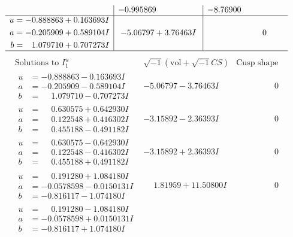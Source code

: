\documentclass[1p]{elsarticle_modified}
\theoremstyle{definition}
\newcommand{\I}{\sqrt{-1}}
\begin{document}
$$\begin{array}{c|c|c}
 & -0.995869\phantom{ +0.000000I} & -8.76900\phantom{ +0.000000I} \\ \hline\begin{aligned}
u &= -0.888863 + 0.163693 I \\
a &= -0.205909 + 0.589104 I \\
b &= \phantom{-}1.079710 + 0.707273 I\end{aligned}
 & -5.06797 + 3.76463 I & \phantom{-0.000000 } 0\\
 \hline 
 \end{array}$$\newpage$$\begin{array}{c|c|c}  
\text{Solutions to }I^u_{1}& \I (\text{vol} + \sqrt{-1}CS) & \text{Cusp shape}\\
 \hline 
\begin{aligned}
u &= -0.888863 - 0.163693 I \\
a &= -0.205909 - 0.589104 I \\
b &= \phantom{-}1.079710 - 0.707273 I\end{aligned}
 & -5.06797 - 3.76463 I & \phantom{-0.000000 } 0 \\ \hline\begin{aligned}
u &= \phantom{-}0.630575 + 0.642930 I \\
a &= \phantom{-}0.122548 + 0.416302 I \\
b &= \phantom{-}0.455188 - 0.491182 I\end{aligned}
 & -3.15892 - 2.36393 I & \phantom{-0.000000 } 0 \\ \hline\begin{aligned}
u &= \phantom{-}0.630575 - 0.642930 I \\
a &= \phantom{-}0.122548 - 0.416302 I \\
b &= \phantom{-}0.455188 + 0.491182 I\end{aligned}
 & -3.15892 + 2.36393 I & \phantom{-0.000000 } 0 \\ \hline\begin{aligned}
u &= \phantom{-}0.191280 + 1.084180 I \\
a &= -0.0578598 - 0.0150131 I \\
b &= -0.816117 - 1.074180 I\end{aligned}
 & \phantom{-}1.81959 + 11.50800 I & \phantom{-0.000000 } 0 \\ \hline\begin{aligned}
u &= \phantom{-}0.191280 - 1.084180 I \\
a &= -0.0578598 + 0.0150131 I \\
b &= -0.816117 + 1.074180 I\end{aligned}

\end{array}$$
\end{document}
